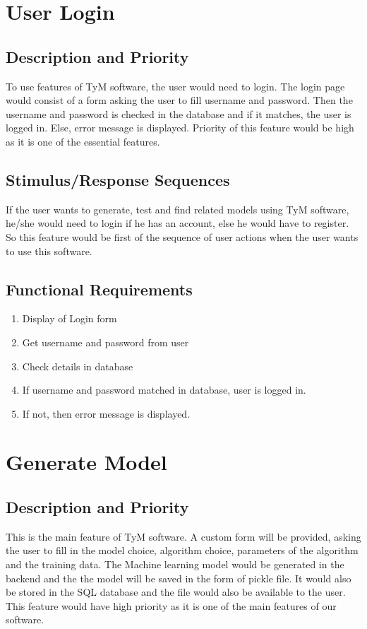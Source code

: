 \documentclass{scrreprt}
\begin{document}
\section{User Login}

\subsection{Description and Priority}
To use features of TyM software, the user would need to login. The login page would consist of a form asking the user to fill username and password. Then the username and password is checked in the database and if it matches, the user is logged in. Else, error message is displayed. Priority of this feature would be high as it is one of the essential features.

\subsection{Stimulus/Response Sequences}
If the user wants to generate, test and find related models using TyM software, he/she would need to login if he has an account, else he would have to register. So this feature would be first of the sequence of user actions when the user wants to use this software.  

\subsection{Functional Requirements}
\begin{enumerate}
\item Display of Login form
\item Get username and password from user
\item Check details in database
\item If username and password matched in database, user is logged in.
\item If not, then error message is displayed.
\end{enumerate}

\section{Generate Model}

\subsection{Description and Priority}
This is the main feature of TyM software. A custom form will be provided, asking the user to fill in the model choice, algorithm choice, parameters of the algorithm and the training data. The Machine learning model would be generated in the backend and the the model will be saved in the form of pickle file. It would also be stored in the SQL database and the file would also be available to the user. This feature would have high priority as it is one of the main features of our software.
\end{document}
